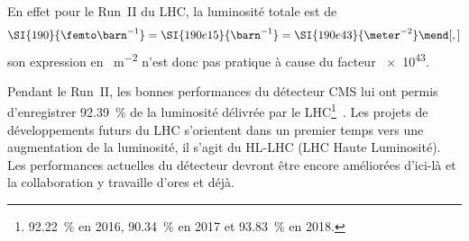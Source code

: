 En effet pour le Run~II du LHC, la luminosité totale est de
\begin{equation}
\SI{190}{\femto\barn^{-1}} = \SI{190e15}{\barn^{-1}} = \SI{190e43}{\meter^{-2}}
\mend[,]
\end{equation}
son expression en \SI{}{\meter^{-2}} n'est donc pas pratique à cause du facteur \num{e43}.
\par Pendant le Run~II, les bonnes performances du détecteur CMS lui ont permis d'enregistrer \SI{92.39}{\%} de la luminosité délivrée par le LHC\footnote{\SI{92.22}{\%} en 2016, \SI{90.34}{\%} en 2017 et \SI{93.83}{\%} en 2018.}~\cite{CMS-PAS-LUM-17-001,CMS-PAS-LUM-17-004,CMS-PAS-LUM-18-002}.
Les projets de développements futurs du LHC s'orientent dans un premier temps vers une augmentation de la luminosité, il s'agit du \og HL-LHC \fg{} (LHC Haute Luminosité).
Les performances actuelles du détecteur devront être encore améliorées d'ici-là et la collaboration y travaille d'ores et déjà.
